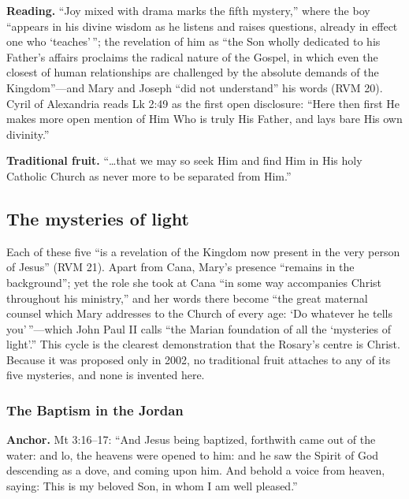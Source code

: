 \textbf{Reading.} ``Joy mixed with drama marks the fifth mystery,''
where the boy ``appears in his divine wisdom as he listens and raises
questions, already in effect one who `teaches'\,''; the revelation of him
as ``the Son wholly dedicated to his Father's affairs proclaims the
radical nature of the Gospel, in which even the closest of human
relationships are challenged by the absolute demands of the
Kingdom''---and Mary and Joseph ``did not understand'' his words (RVM
20). Cyril of Alexandria reads Lk 2:49 as the first open disclosure:
``Here then first He makes more open mention of Him Who is truly His
Father, and lays bare His own divinity.''

\textbf{Traditional fruit.} ``\ldots that we may so seek Him and find
Him in His holy Catholic Church as never more to be separated from
Him.''

\subsection{The mysteries of light}

Each of these five ``is a revelation of the Kingdom now present in the
very person of Jesus'' (RVM 21). Apart from Cana, Mary's presence
``remains in the background''; yet the role she took at Cana ``in some
way accompanies Christ throughout his ministry,'' and her words there
become ``the great maternal counsel which Mary addresses to the Church
of every age: `Do whatever he tells you'\,''---which John Paul II calls
``the Marian foundation of all the `mysteries of light'.'' This cycle is
the clearest demonstration that the Rosary's centre is Christ. Because
it was proposed only in 2002, no traditional fruit attaches to any of
its five mysteries, and none is invented here.

\subsubsection{The Baptism in the Jordan}

\textbf{Anchor.} Mt 3:16--17: ``And Jesus being baptized, forthwith came
out of the water: and lo, the heavens were opened to him: and he saw the
Spirit of God descending as a dove, and coming upon him. And behold a
voice from heaven, saying: This is my beloved Son, in whom I am well
pleased.''


